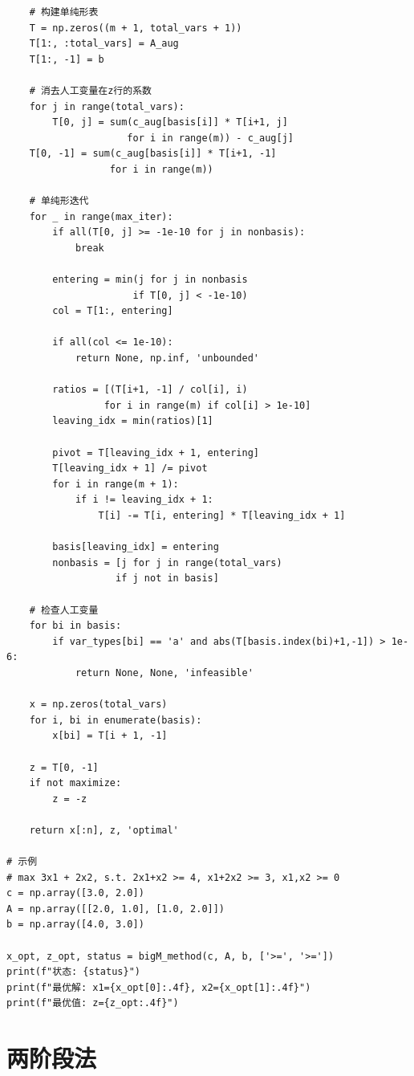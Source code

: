 \begin{codebox}[大M法实现]
\begin{lstlisting}
    # 构建单纯形表
    T = np.zeros((m + 1, total_vars + 1))
    T[1:, :total_vars] = A_aug
    T[1:, -1] = b
    
    # 消去人工变量在z行的系数
    for j in range(total_vars):
        T[0, j] = sum(c_aug[basis[i]] * T[i+1, j]
                     for i in range(m)) - c_aug[j]
    T[0, -1] = sum(c_aug[basis[i]] * T[i+1, -1]
                  for i in range(m))
    
    # 单纯形迭代
    for _ in range(max_iter):
        if all(T[0, j] >= -1e-10 for j in nonbasis):
            break
        
        entering = min(j for j in nonbasis
                      if T[0, j] < -1e-10)
        col = T[1:, entering]
        
        if all(col <= 1e-10):
            return None, np.inf, 'unbounded'
        
        ratios = [(T[i+1, -1] / col[i], i)
                 for i in range(m) if col[i] > 1e-10]
        leaving_idx = min(ratios)[1]
        
        pivot = T[leaving_idx + 1, entering]
        T[leaving_idx + 1] /= pivot
        for i in range(m + 1):
            if i != leaving_idx + 1:
                T[i] -= T[i, entering] * T[leaving_idx + 1]
        
        basis[leaving_idx] = entering
        nonbasis = [j for j in range(total_vars)
                   if j not in basis]
    
    # 检查人工变量
    for bi in basis:
        if var_types[bi] == 'a' and abs(T[basis.index(bi)+1,-1]) > 1e-6:
            return None, None, 'infeasible'
    
    x = np.zeros(total_vars)
    for i, bi in enumerate(basis):
        x[bi] = T[i + 1, -1]
    
    z = T[0, -1]
    if not maximize:
        z = -z
    
    return x[:n], z, 'optimal'

# 示例
# max 3x1 + 2x2, s.t. 2x1+x2 >= 4, x1+2x2 >= 3, x1,x2 >= 0
c = np.array([3.0, 2.0])
A = np.array([[2.0, 1.0], [1.0, 2.0]])
b = np.array([4.0, 3.0])

x_opt, z_opt, status = bigM_method(c, A, b, ['>=', '>='])
print(f"状态: {status}")
print(f"最优解: x1={x_opt[0]:.4f}, x2={x_opt[1]:.4f}")
print(f"最优值: z={z_opt:.4f}")
\end{lstlisting}
\end{codebox}

\section{两阶段法}\label{sec:twophase}

